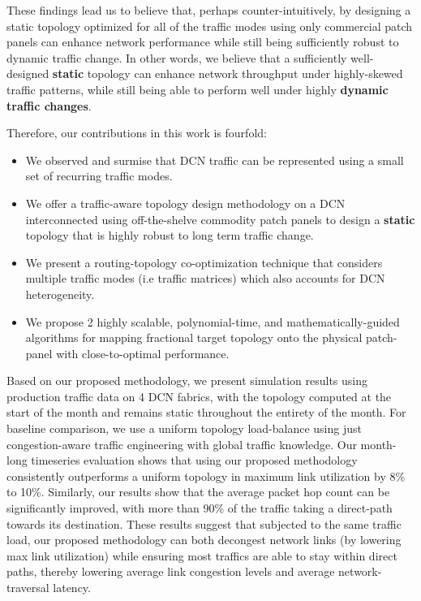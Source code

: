 \documentclass[sigconf]{acmart}
\theoremstyle{definition}
\begin{document}
These findings lead us to believe that, perhaps counter-intuitively, by designing a static topology optimized for all of the traffic modes using only commercial patch panels can enhance network performance while still being sufficiently robust to dynamic traffic change. In other words, we believe that a sufficiently well-designed \textbf{static} topology can enhance network throughput under highly-skewed traffic patterns, while still being able to perform well under highly \textbf{dynamic traffic changes}.  

Therefore, our contributions in this work is fourfold:
\begin{itemize}
    \item We observed and surmise that DCN traffic can be represented using a small set of recurring traffic modes.
    \item We offer a traffic-aware topology design methodology on a DCN interconnected using off-the-shelve commodity patch panels to design a \textbf{static} topology that is highly robust to long term traffic change.
    \item We present a routing-topology co-optimization technique that considers multiple traffic modes (i.e traffic matrices) which also accounts for DCN heterogeneity.
    \item We propose 2 highly scalable, polynomial-time, and mathematically-guided algorithms for mapping fractional target topology onto the physical patch-panel with close-to-optimal performance.
\end{itemize}

Based on our proposed methodology, we present simulation results using production traffic data on 4 DCN fabrics, with the topology computed at the start of the month and remains static throughout the entirety of the month. For baseline comparison, we use a uniform topology load-balance using just congestion-aware traffic engineering with global traffic knowledge. Our month-long timeseries evaluation shows that using our proposed methodology consistently outperforms a uniform topology in maximum link utilization by 8\% to 10\%. Similarly, our results show that the average packet hop count can be significantly improved, with more than 90\% of the traffic taking a direct-path towards its destination. These results suggest that subjected to the same traffic load, our proposed methodology can both decongest network links (by lowering max link utilization) while ensuring most traffics are able to stay within direct paths, thereby lowering average link congestion levels and average network-traversal latency. 
\end{document}
